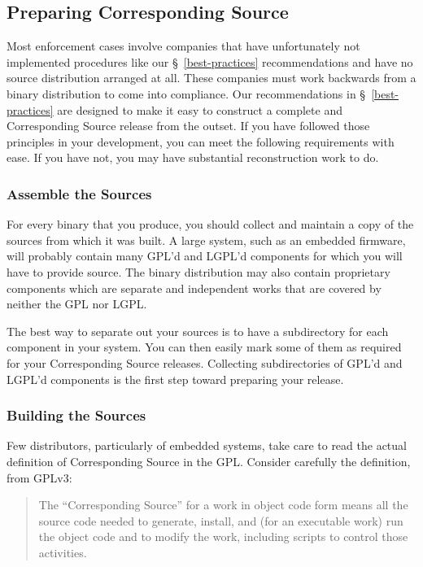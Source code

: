 \documentclass[letterpaper]{fixme}
\begin{document}
\subsection{Preparing Corresponding Source}
\label{corresponding-source}

Most enforcement cases involve companies that have unfortunately not
implemented procedures like our \S~\ref{best-practices} recommendations
and have no source distribution arranged at all.  These companies must
work backwards from a binary distribution to come into compliance.  Our
recommendations in \S~\ref{best-practices} are designed to make it easy to
construct a complete and Corresponding Source release from the outset.  If
you have followed those principles in your development, you can meet the
following requirements with ease.  If you have not, you may have
substantial reconstruction work to do.

\subsubsection{Assemble the Sources}

For every binary that you produce, you should collect and maintain a copy
of the sources from which it was built.  A large system, such as an
embedded firmware, will probably contain many GPL'd and LGPL'd components
for which you will have to provide source.  The binary distribution may
also contain proprietary components which are separate and independent
works that are covered by neither the GPL nor LGPL\@.

The best way to separate out your sources is to have a subdirectory for
each component in your system.  You can then easily mark some of them as
required for your Corresponding Source releases.  Collecting
subdirectories of GPL'd and LGPL'd components is the first step toward
preparing your release.

\subsubsection{Building the Sources}

Few distributors, particularly of embedded systems, take care to read the
actual definition of Corresponding Source in the GPL\@.  Consider
carefully the definition, from GPLv3:
\begin{quote}
  The ``Corresponding Source'' for a work in object code form means all
  the source code needed to generate, install, and (for an executable
  work) run the object code and to modify the work, including scripts to
  control those activities.
\end{quote}
\end{document}

